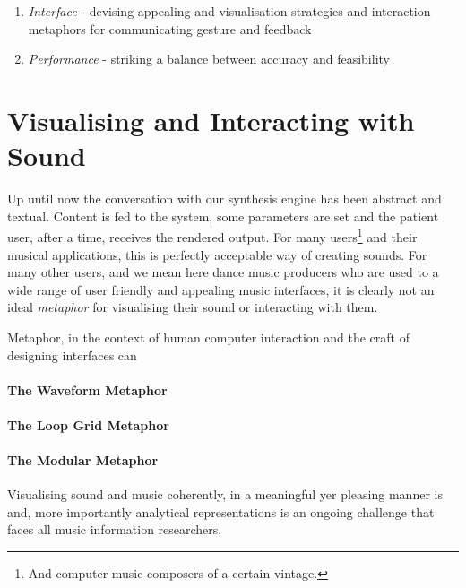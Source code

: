 \begin{enumerate}
  \item \textit{Interface} - devising appealing and visualisation strategies and interaction metaphors for communicating gesture and feedback
  \item \textit{Performance} - striking a balance between accuracy and feasibility 
\end{enumerate}


\section{Visualising and Interacting with Sound}

Up until now the conversation with our synthesis engine has been abstract and textual. Content is fed to the system, some parameters are set and the patient user, after a time, receives the rendered output. For many users\footnote{And computer music composers of a certain vintage.} and their musical applications, this is perfectly acceptable way of creating sounds. For many other users, and we mean here dance music producers who are used to a wide range of user friendly and appealing music interfaces, it is clearly not an ideal \textit{metaphor} for visualising their sound or interacting with them. 

Metaphor, in the context of human computer interaction and the craft of designing interfaces can  

\paragraph{The Waveform Metaphor}

\paragraph{The Loop Grid Metaphor}

\paragraph{The Modular Metaphor}


Visualising sound and music coherently, in a meaningful yer pleasing manner is and, more importantly analytical representations is an ongoing challenge that faces all music information researchers.

